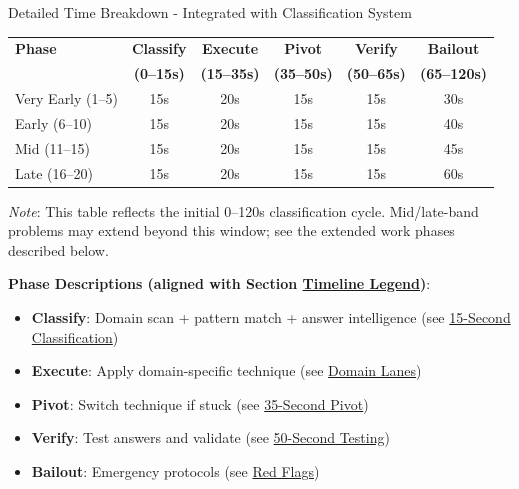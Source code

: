 \documentclass{article}
\begin{document}
\begin{timebox}{Detailed Time Breakdown - Integrated with Classification System}
\begin{center}
\begin{tabular}{|l|c|c|c|c|c|}
\hline
\textbf{Phase} & \textbf{Classify} & \textbf{Execute} & \textbf{Pivot} & \textbf{Verify} & \textbf{Bailout} \\
 & \textbf{(0--15s)} & \textbf{(15--35s)} & \textbf{(35--50s)} & \textbf{(50--65s)} & \textbf{(65--120s)} \\
\hline
Very Early (1--5) & 15s & 20s & 15s & 15s & 30s \\
Early (6--10) & 15s & 20s & 15s & 15s & 40s \\
Mid (11--15) & 15s & 20s & 15s & 15s & 45s \\
Late (16--20) & 15s & 20s & 15s & 15s & 60s \\
\hline
\end{tabular}
\end{center}

\textit{Note}: This table reflects the initial 0--120s classification cycle. Mid/late-band problems may extend beyond this window; see the extended work phases described below.

\textbf{Phase Descriptions (aligned with Section \hyperlink{timeline-legend}{Timeline Legend})}: 
\begin{itemize}[nosep]
\item \textbf{Classify}: Domain scan + pattern match + answer intelligence (see \hyperlink{classify-15}{15-Second Classification})
\item \textbf{Execute}: Apply domain-specific technique (see \hyperlink{domain-lanes}{Domain Lanes})
\item \textbf{Pivot}: Switch technique if stuck (see \hyperlink{pivot35}{35-Second Pivot})
\item \textbf{Verify}: Test answers and validate (see \hyperlink{answer-test-50}{50-Second Testing})
\item \textbf{Bailout}: Emergency protocols (see \hyperlink{redflags}{Red Flags})
\end{itemize}

\end{timebox}
\end{document}
